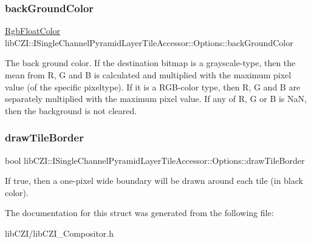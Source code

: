 \subsubsection{\texorpdfstring{back\+Ground\+Color}{backGroundColor}}
{\footnotesize\ttfamily \hyperlink{structlib_c_z_i_1_1_rgb_float_color}{Rgb\+Float\+Color} lib\+C\+Z\+I\+::\+I\+Single\+Channel\+Pyramid\+Layer\+Tile\+Accessor\+::\+Options\+::back\+Ground\+Color}

The back ground color. If the destination bitmap is a grayscale-\/type, then the mean from R, G and B is calculated and multiplied with the maximum pixel value (of the specific pixeltype). If it is a R\+G\+B-\/color type, then R, G and B are separately multiplied with the maximum pixel value. If any of R, G or B is NaN, then the background is not cleared. \mbox{\label{structlib_c_z_i_1_1_i_single_channel_pyramid_layer_tile_accessor_1_1_options_a53cf2b7a087395332e1daae3a3318b08}} 
\subsubsection{\texorpdfstring{draw\+Tile\+Border}{drawTileBorder}}
{\footnotesize\ttfamily bool lib\+C\+Z\+I\+::\+I\+Single\+Channel\+Pyramid\+Layer\+Tile\+Accessor\+::\+Options\+::draw\+Tile\+Border}

If true, then a one-\/pixel wide boundary will be drawn around each tile (in black color). 

The documentation for this struct was generated from the following file\+:\begin{DoxyCompactItemize}
\item 
lib\+C\+Z\+I/lib\+C\+Z\+I\+\_\+\+Compositor.\+h\end{DoxyCompactItemize}
